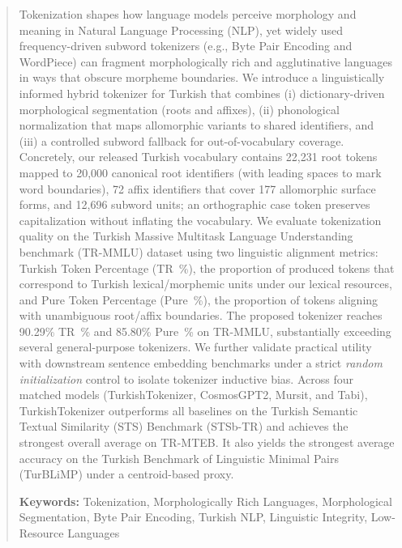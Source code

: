 \begin{abstract}

Tokenization shapes how language models perceive morphology and meaning in Natural Language Processing (NLP), yet widely used frequency-driven subword tokenizers (e.g., Byte Pair Encoding and WordPiece) can fragment morphologically rich and agglutinative languages in ways that obscure morpheme boundaries. We introduce a linguistically informed hybrid tokenizer for Turkish that combines (i) dictionary-driven morphological segmentation (roots and affixes), (ii) phonological normalization that maps allomorphic variants to shared identifiers, and (iii) a controlled subword fallback for out-of-vocabulary coverage. Concretely, our released Turkish vocabulary contains 22,231 root tokens mapped to 20,000 canonical root identifiers (with leading spaces to mark word boundaries), 72 affix identifiers that cover 177 allomorphic surface forms, and 12,696 subword units; an orthographic case token preserves capitalization without inflating the vocabulary. We evaluate tokenization quality on the Turkish Massive Multitask Language Understanding benchmark (TR-MMLU) dataset using two linguistic alignment metrics: Turkish Token Percentage (TR~\%), the proportion of produced tokens that correspond to Turkish lexical/morphemic units under our lexical resources, and Pure Token Percentage (Pure~\%), the proportion of tokens aligning with unambiguous root/affix boundaries. The proposed tokenizer reaches 90.29\% TR~\% and 85.80\% Pure~\% on TR-MMLU, substantially exceeding several general-purpose tokenizers. We further validate practical utility with downstream sentence embedding benchmarks under a strict \emph{random initialization} control to isolate tokenizer inductive bias. Across four matched models (TurkishTokenizer, CosmosGPT2, Mursit, and Tabi), TurkishTokenizer outperforms all baselines on the Turkish Semantic Textual Similarity (STS) Benchmark (STSb-TR) and achieves the strongest overall average on TR-MTEB. It also yields the strongest average accuracy on the Turkish Benchmark of Linguistic Minimal Pairs (TurBLiMP) under a centroid-based proxy.

\textbf{Keywords:} Tokenization, Morphologically Rich Languages, Morphological Segmentation, Byte Pair Encoding, Turkish NLP, Linguistic Integrity, Low-Resource Languages
\end{abstract}
